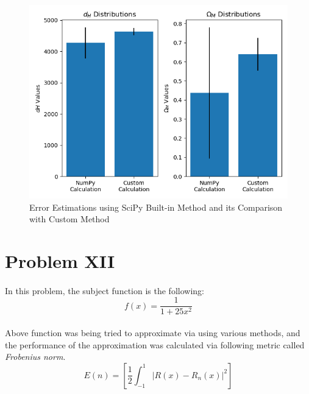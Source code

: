\documentclass[letterpaper,12pt]{article}
\begin{document}
\begin{figure}[H]
    \centerline{\includegraphics[width=0.7\linewidth]{figures/dhomegadistcomp.png}}
    \caption{Error Estimations using SciPy Built-in Method and its Comparison with Custom Method}
    \label{fig:dhomegadistcomp}
    \end{figure}
    

\section{Problem XII}
\paragraph{} In this problem, the subject function is the following:
\begin{equation*}
    f(x) = \frac{1}{1 + 25x^2}
\end{equation*}
\paragraph{}Above function was being tried to approximate via using various methods, and the performance of the approximation was calculated via following metric called \textit{Frobenius norm}.
\begin{equation*}
    E(n) = \left[ \frac{1}{2} \int_{-1}^{1} \lvert R(x) - R_n(x)  \rvert ^2\right]
\end{equation*}
\end{document}
